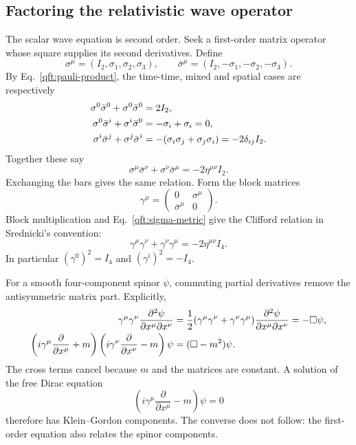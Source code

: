\subsection{Factoring the relativistic wave operator}
The scalar wave equation is second order. Seek a first-order matrix
operator whose square supplies its second derivatives. Define
\begin{equation}\label{qft:sigma-four}
 \sigma^\mu=(I_2,\sigma_1,\sigma_2,\sigma_3),\qquad
 \bar\sigma^\mu=(I_2,-\sigma_1,-\sigma_2,-\sigma_3).
\end{equation}
By Eq.~\eqref{qft:pauli-product}, the time-time, mixed and spatial cases
are respectively
\begin{align}
 \sigma^0\bar\sigma^0+\sigma^0\bar\sigma^0&=2I_2,\notag\\
 \sigma^0\bar\sigma^i+\sigma^i\bar\sigma^0&=-\sigma_i+\sigma_i=0,\notag\\
 \sigma^i\bar\sigma^j+\sigma^j\bar\sigma^i
 &=-(\sigma_i\sigma_j+\sigma_j\sigma_i)=-2\delta_{ij}I_2.
 \label{qft:sigma-metric-cases}
\end{align}
Together these say
\begin{equation}\label{qft:sigma-metric}
 \sigma^\mu\bar\sigma^\nu+\sigma^\nu\bar\sigma^\mu
 =-2\eta^{\mu\nu}I_2.
\end{equation}
Exchanging the bars gives the same relation. Form the block matrices
\begin{equation}\label{qft:gamma-definition}
 \gamma^\mu=\begin{pmatrix}0&\sigma^\mu\\\bar\sigma^\mu&0\end{pmatrix}.
\end{equation}
Block multiplication and Eq.~\eqref{qft:sigma-metric} give the Clifford
relation in Srednicki's convention:
\begin{equation}\label{qft:clifford-relation}
 \gamma^\mu\gamma^\nu+\gamma^\nu\gamma^\mu
 =-2\eta^{\mu\nu}I_4.
\end{equation}
In particular $(\gamma^0)^2=I_4$ and $(\gamma^i)^2=-I_4$.

For a smooth four-component spinor $\psi$, commuting partial derivatives
remove the antisymmetric matrix part. Explicitly,
\begin{align}
 \gamma^\mu\gamma^\nu
 \frac{\partial^2\psi}{\partial x^\mu\partial x^\nu}
 &=\frac12(\gamma^\mu\gamma^\nu+\gamma^\nu\gamma^\mu)
 \frac{\partial^2\psi}{\partial x^\mu\partial x^\nu}
 =-\Box\psi,\notag\\
 \left(i\gamma^\mu\frac{\partial}{\partial x^\mu}+m\right)
 \left(i\gamma^\nu\frac{\partial}{\partial x^\nu}-m\right)\psi
 &=(\Box-m^2)\psi.
 \label{qft:dirac-square}
\end{align}
The cross terms cancel because $m$ and the matrices are constant. A
solution of the free Dirac equation
\begin{equation}\label{qft:dirac-equation}
 \left(i\gamma^\mu\frac{\partial}{\partial x^\mu}-m\right)\psi=0
\end{equation}
therefore has Klein--Gordon components. The converse does not follow:
the first-order equation also relates the spinor components.

